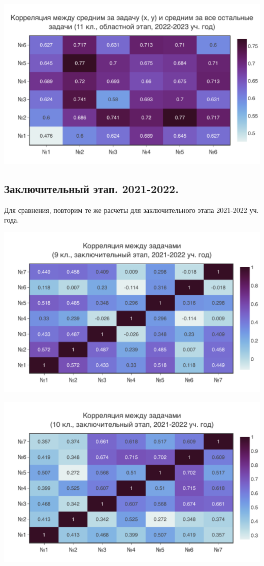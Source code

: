 \includegraphics[width=\linewidth]{../export/pdf/results/2023/oblast/grade11-avg.pdf}

\subsection{Заключительный этап. 2021-2022.}

Для сравнения, повторим те же расчеты для заключительного этапа 2021-2022 уч. года.

\includegraphics[width=\linewidth]{../export/pdf/results/2022/respa/grade9.pdf}

\includegraphics[width=\linewidth]{../export/pdf/results/2022/respa/grade10.pdf}

